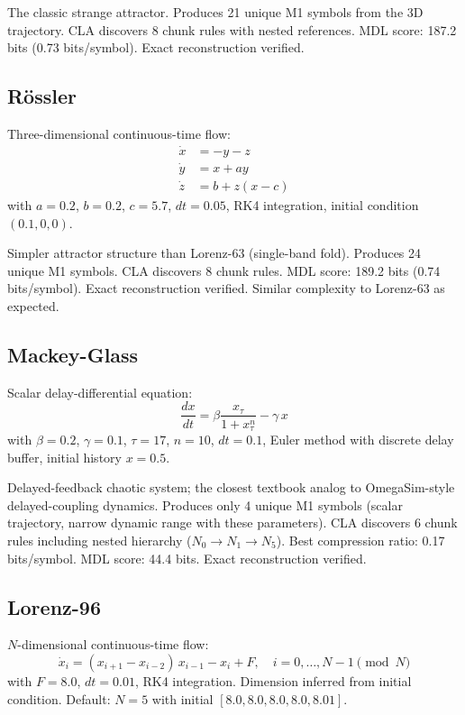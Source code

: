 \documentclass[11pt]{article}
\begin{document}
The classic strange attractor. Produces 21 unique M1 symbols from the 3D
trajectory. CLA discovers 8 chunk rules with nested references. MDL score:
187.2 bits (0.73 bits/symbol). Exact reconstruction verified.

\subsection{R\"ossler}

Three-dimensional continuous-time flow:
\begin{align}
\dot{x} &= -y - z \\
\dot{y} &= x + ay \\
\dot{z} &= b + z(x - c)
\end{align}
with $a = 0.2$, $b = 0.2$, $c = 5.7$, $dt = 0.05$, RK4 integration,
initial condition $(0.1, 0, 0)$.

Simpler attractor structure than Lorenz-63 (single-band fold). Produces 24
unique M1 symbols. CLA discovers 8 chunk rules. MDL score: 189.2 bits
(0.74 bits/symbol). Exact reconstruction verified. Similar complexity to
Lorenz-63 as expected.

\subsection{Mackey-Glass}

Scalar delay-differential equation:
\begin{equation}
\frac{dx}{dt} = \beta \frac{x_{\tau}}{1 + x_{\tau}^n} - \gamma \, x
\end{equation}
with $\beta = 0.2$, $\gamma = 0.1$, $\tau = 17$, $n = 10$, $dt = 0.1$,
Euler method with discrete delay buffer, initial history $x = 0.5$.

Delayed-feedback chaotic system; the closest textbook analog to
OmegaSim-style delayed-coupling dynamics. Produces only 4 unique M1 symbols
(scalar trajectory, narrow dynamic range with these parameters). CLA
discovers 6 chunk rules including nested hierarchy
($N_0 \to N_1 \to N_5$). Best compression ratio: 0.17 bits/symbol. MDL
score: 44.4 bits. Exact reconstruction verified.

\subsection{Lorenz-96}

$N$-dimensional continuous-time flow:
\begin{equation}
\dot{x}_i = (x_{i+1} - x_{i-2}) \, x_{i-1} - x_i + F, \quad
i = 0, \ldots, N-1 \pmod{N}
\end{equation}
with $F = 8.0$, $dt = 0.01$, RK4 integration. Dimension inferred from
initial condition. Default: $N = 5$ with initial $[8.0, 8.0, 8.0, 8.0, 8.01]$.
\end{document}
